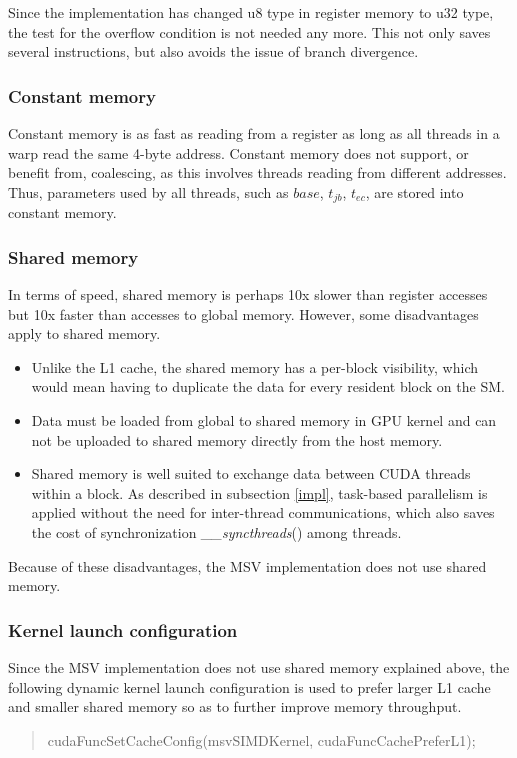 Since the implementation has changed u8 type in register memory to u32 type, the test for the overflow condition is not needed any more. This not only saves several instructions, but also avoids the issue of branch divergence.

\subsubsection*{Constant memory}
\label{constant}
Constant memory is as fast as reading from a register as long as all threads in a warp read the same 4-byte address. Constant memory does not support, or benefit from, coalescing, as this involves threads reading from different addresses. Thus, parameters used by all threads, such as $base$, $t_{jb}$, $t_{ec}$, are stored into constant memory.

\subsubsection*{Shared memory}
\label{shared}
In terms of speed, shared memory is perhaps 10x slower than register accesses but 10x faster than accesses to global memory. However, some disadvantages apply to shared memory.

\begin{itemize}
 \item Unlike the L1 cache, the shared memory has a per-block visibility, which would mean having to duplicate the data for every resident block on the SM.
 \item Data must be loaded from global to shared memory in GPU kernel and can not be uploaded to shared memory directly from the host memory.
 \item Shared memory is well suited to exchange data between CUDA threads within a block. As described in subsection \ref{impl}, task-based parallelism is applied without the need for inter-thread communications, which also saves the cost of synchronization \emph{\_\_syncthreads}() among threads.
\end{itemize}

Because of these disadvantages, the MSV implementation does not use shared memory.

\subsubsection*{Kernel launch configuration}
\label{launch}
Since the MSV implementation does not use shared memory explained above, the following dynamic kernel launch configuration is used to prefer larger L1 cache and smaller shared memory so as to further improve memory throughput.
\begin{quote}
\selectfont
 cudaFuncSetCacheConfig(msvSIMDKernel, cudaFuncCachePreferL1);
\end{quote}

